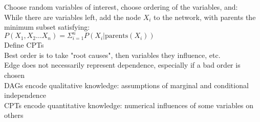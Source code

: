 \documentclass[10pt,letterpaper,unboxed,cm]{article}
\begin{document}
Choose random variables of interest, choose ordering of the variables, and:\\
While there are variables left, add the node $X_i$ to the network, with parents the minimum subset satisfying:\\
$P(X_1, X_2 \ldots X_n) = \Sigma^n_{i=1}P(X_i|\text{parents}(X_i))$\\
Define CPTs\\
Best order is to take "root causes", then variables they influence, etc.\\
Edge does not necessarily represent dependence, especially if a bad order is chosen\\
DAGs encode qualitative knowledge: assumptions of marginal and conditional independence\\
CPTs encode quantitative knowledge: numerical influences of some variables on others\\
\end{document}
